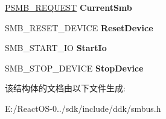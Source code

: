 \begin{DoxyCompactItemize}
\mbox{\label{struct___s_m_b___c_l_a_s_s_a2d59e26cdeb659313579659b804bd05b}} 
\hyperlink{struct___s_m_b___r_e_q_u_e_s_t}{P\+S\+M\+B\+\_\+\+R\+E\+Q\+U\+E\+ST} {\bfseries Current\+Smb}
\item 
\mbox{\label{struct___s_m_b___c_l_a_s_s_af8ccbe5047ed0a6c985b67cc02180031}} 
S\+M\+B\+\_\+\+R\+E\+S\+E\+T\+\_\+\+D\+E\+V\+I\+CE {\bfseries Reset\+Device}
\item 
\mbox{\label{struct___s_m_b___c_l_a_s_s_a1f7e6e722747384eb998fff01a566623}} 
S\+M\+B\+\_\+\+S\+T\+A\+R\+T\+\_\+\+IO {\bfseries Start\+Io}
\item 
\mbox{\label{struct___s_m_b___c_l_a_s_s_a49b41d249daa372d319005bd9c8644c6}} 
S\+M\+B\+\_\+\+S\+T\+O\+P\+\_\+\+D\+E\+V\+I\+CE {\bfseries Stop\+Device}
\end{DoxyCompactItemize}


该结构体的文档由以下文件生成\+:\begin{DoxyCompactItemize}
\item 
E\+:/\+React\+O\+S-\/0../sdk/include/ddk/smbus.\+h\end{DoxyCompactItemize}
